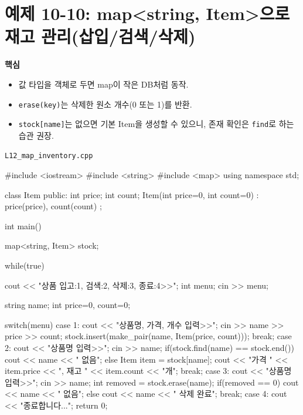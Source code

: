 \documentclass[11pt,a4paper]{article}
\newcommand{\filetag}[1]{\texttt{\color{Accent}#1}}
\begin{document}
\section{예제 10-10: map<string, Item>으로 재고 관리(삽입/검색/삭제)}
\begin{GoalBox}
\textbf{핵심}
\begin{itemize}[leftmargin=18pt]
  \item 값 타입을 객체로 두면 map이 작은 DB처럼 동작.
  \item \texttt{erase(key)}는 삭제한 원소 개수(0 또는 1)를 반환.
  \item \texttt{stock[name]}는 없으면 기본 Item을 생성할 수 있으니,
        존재 확인은 \texttt{find}로 하는 습관 권장.
\end{itemize}
\end{GoalBox}

\noindent\filetag{L12\_map\_inventory.cpp}
\begin{cppcode}
#include <iostream>
#include <string>
#include <map>
using namespace std;

class Item {
public:
    int price;
    int count;
    Item(int price=0, int count=0) : price(price), count(count) {}
};

int main() {
    map<string, Item> stock;

    while(true) {
        cout << "상품 입고:1, 검색:2, 삭제:3, 종료:4>>";
        int menu;
        cin >> menu;

        string name;
        int price=0, count=0;

        switch(menu) {
        case 1:
            cout << "상품명, 가격, 개수 입력>>";
            cin >> name >> price >> count;
            stock.insert(make_pair(name, Item(price, count)));
            break;
        case 2:
            cout << "상품명 입력>>";
            cin >> name;
            if(stock.find(name) == stock.end())
                cout << name << " 없음\n";
            else {
                Item item = stock[name];
                cout << "가격 " << item.price << ", 재고 " << item.count << "개\n";
            }
            break;
        case 3: {
            cout << "상품명 입력>>";
            cin >> name;
            int removed = stock.erase(name);
            if(removed == 0) cout << name << " 없음\n";
            else cout << name << " 삭제 완료\n";
            break;
        }
        case 4:
            cout << "종료합니다...\n";
            return 0;
        }
    }
}
\end{cppcode}
\end{document}

